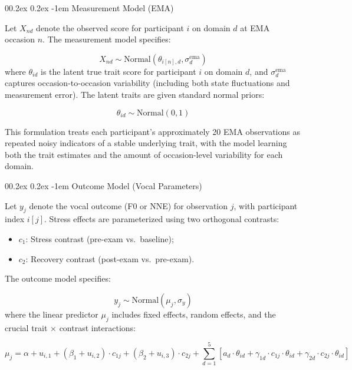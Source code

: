 \documentclass[
  english,
  man,floatsintext]{apa6}
\makeatletter
\let\oldparagraph\paragraph
\renewcommand{\paragraph}{
    \@ifstar
      \xxxParagraphStar
      \xxxParagraphNoStar
  }
\newcommand{\xxxParagraphStar}[1]{\oldparagraph*{#1}\mbox{}}
\newcommand{\xxxParagraphNoStar}[1]{\oldparagraph{#1}\mbox{}}
\providecommand{\tightlist}{%
  \setlength{\itemsep}{0pt}\setlength{\parskip}{0pt}}
\renewcommand{\paragraph}{\@startsection{paragraph}{4}{\parindent}%
  {0\baselineskip \@plus 0.2ex \@minus 0.2ex}%
  {-1em}%
  {\normalfont\normalsize\bfseries\itshape\typesectitle}}
\makeatother
\begin{document}
\paragraph{Measurement Model (EMA)}\label{measurement-model-ema}

Let \(X_{nd}\) denote the observed score for participant \(i\) on domain \(d\) at EMA occasion \(n\). The measurement model specifies:

\[
X_{nd} \sim \text{Normal}(\theta_{i[n],d}, \sigma_d^{\text{ema}})
\]
where \(\theta_{id}\) is the latent true trait score for participant \(i\) on domain \(d\), and \(\sigma_d^{\text{ema}}\) captures occasion-to-occasion variability (including both state fluctuations and measurement error). The latent traits are given standard normal priors:

\[
\theta_{id} \sim \text{Normal}(0, 1)
\]

This formulation treats each participant's approximately 20 EMA observations as repeated noisy indicators of a stable underlying trait, with the model learning both the trait estimates and the amount of occasion-level variability for each domain.

\paragraph{Outcome Model (Vocal Parameters)}\label{outcome-model-vocal-parameters}

Let \(y_j\) denote the vocal outcome (F0 or NNE) for observation \(j\), with participant index \(i[j]\). Stress effects are parameterized using two orthogonal contrasts:

\begin{itemize}
\tightlist
\item
  \(c_1\): Stress contrast (pre-exam vs.~baseline);
\item
  \(c_2\): Recovery contrast (post-exam vs.~pre-exam).
\end{itemize}

The outcome model specifies:

\[
y_j \sim \text{Normal}(\mu_j, \sigma_y)
\]
where the linear predictor \(\mu_j\) includes fixed effects, random effects, and the crucial trait × contrast interactions:

\[
\mu_j = \alpha + u_{i,1} + (\beta_1 + u_{i,2}) \cdot c_{1j} + (\beta_2 + u_{i,3}) \cdot c_{2j} + \sum_{d=1}^{5} \left[ a_d \cdot \theta_{id} + \gamma_{1d} \cdot c_{1j} \cdot \theta_{id} + \gamma_{2d} \cdot c_{2j} \cdot \theta_{id} \right]
\]
\end{document}
